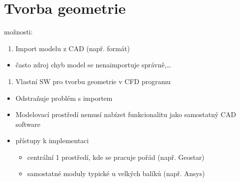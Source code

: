 \documentclass[letterpaper,10pt,czech]{sphinxmanual}
\begin{document}
\section{Tvorba geometrie}
\label{\detokenize{prednaska_23092022:tvorba-geometrie}}
 možnosti:
\begin{enumerate}
%
\item {} 
\sphinxAtStartPar
Import modelu z CAD (např.  formát)

\end{enumerate}
\begin{itemize}
\item {} 
\sphinxAtStartPar
často zdroj chyb \textendash{} model se nenaimportuje správně,…

\end{itemize}
\begin{enumerate}
%
\setcounter{enumi}{1}
\item {} 
\sphinxAtStartPar
Vlastní SW pro tvorbu geometrie v CFD programu

\end{enumerate}
\begin{itemize}
\item {} 
\sphinxAtStartPar
Odstraňuje problém s importem

\item {} 
\sphinxAtStartPar
Modelovací prostředí nemusí nabízet funkcionalitu jako samostatný CAD software

\item {} 
 přístupy k implementaci
\begin{itemize}
\item {} 
\sphinxAtStartPar
centrální \sphinxhyphen{} 1 prostředí, kde se pracuje pořád (např. Geostar)

\item {} 
\sphinxAtStartPar
samostatné moduly \sphinxhyphen{} typické u velkých balíků (např. Ansys)

\end{itemize}

\end{itemize}
\end{document}
